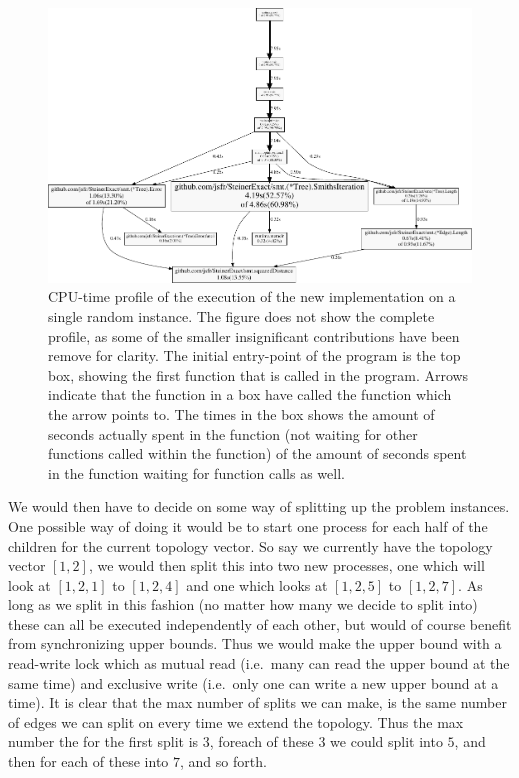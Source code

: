 \begin{figure}[htbp]
  \centering
  \includegraphics[width=\textwidth]{gfx/pprof001}
  \caption[CPU-time profile of a single execution]{CPU-time profile of the
    execution of the new implementation on a single random instance. The figure
    does not show the complete profile, as some of the smaller insignificant
    contributions have been remove for clarity. The initial entry-point of the
    program is the top box, showing the first function that is called in the
    program. Arrows indicate that the function in a box have called the
    function which the arrow points to. The times in the box shows the amount
    of seconds actually spent in the function (not waiting for other functions
    called within the function) of the amount of seconds spent in the function
    waiting for function calls as well.\label{fig:pprof}}
\end{figure}

We would then have to decide on some way of splitting up the problem instances.
One possible way of doing it would be to start one process for each half of the
children for the current topology vector. So say we currently have the topology
vector $[1, 2]$, we would then split this into two new processes, one which will
look at $[1, 2, 1]$ to $[1,2,4]$ and one which looks at $[1, 2, 5]$ to $[1, 2,
7]$. As long as we split in this fashion (no matter how many we decide to split
into) these can all be executed independently of each other, but would of course
benefit from synchronizing upper bounds. Thus we would make the upper bound with
a read-write lock which as mutual read (i.e.\ many can read the upper bound at
the same time) and exclusive write (i.e.\ only one can write a new upper bound
at a time). It is clear that the max number of splits
we can make, is the same number of edges we can split on every time we extend
the topology. Thus the max number the for the first split is $3$, foreach of
these $3$ we could split into $5$, and then for each of these into $7$, and so
forth.

